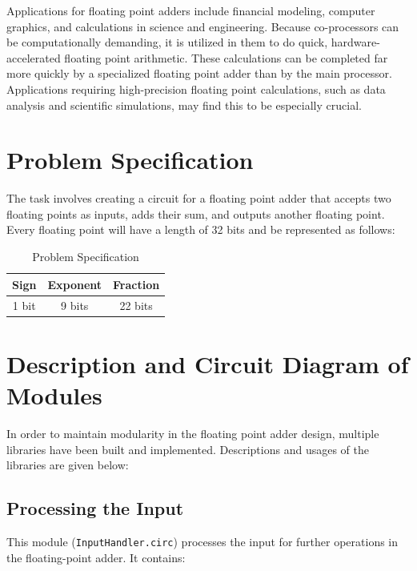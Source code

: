 \documentclass[a4paper,12pt]{article}
\begin{document}
Applications for floating point adders include financial modeling, computer graphics, and calculations in science and engineering. Because co-processors can be computationally demanding, it is utilized in them to do quick, hardware-accelerated floating point arithmetic. These calculations can be completed far more quickly by a specialized floating point adder than by the main processor. Applications requiring high-precision floating point calculations, such as data analysis and scientific simulations, may find this to be especially crucial.





\section{Problem Specification}

The task involves creating a circuit for a floating point adder that accepts two floating points as inputs, adds their sum, and outputs another floating point. Every floating point will have a length of 32 bits and be represented as follows:
\begin{table}[h]
    \centering
    \begin{tabular}{|c|c|c|}
        \hline
        \textbf{Sign} & \textbf{Exponent} & \textbf{Fraction} \\
        \hline
        1 bit & 9 bits & 22 bits \\
        \hline
    \end{tabular}
    \caption{Problem Specification}
    \label{tab:table1}
\end{table}
\newpage




\section{Description and Circuit Diagram of Modules}
 In order to maintain modularity in the floating point adder design, multiple libraries have
 been built and implemented. Descriptions and usages of the libraries are given below:




\subsection{Processing the Input}


This module (\texttt{InputHandler.circ}) processes the input for further operations in the floating-point adder. It contains:
\end{document}
